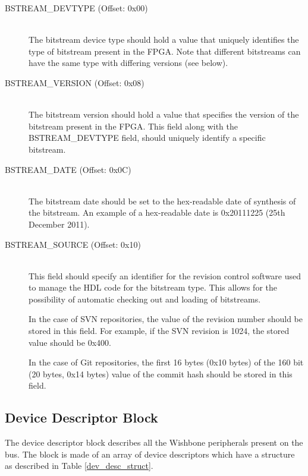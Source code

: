 \documentclass{article}
\begin{document}
\begin{description}
\item[BSTREAM\_DEVTYPE (Offset: 0x00)] \hfill \\
The bitstream device type should hold a value that uniquely identifies the type of 
bitstream present in the FPGA. Note that different bitstreams can have the
same type with differing versions (see below).

\item[BSTREAM\_VERSION (Offset: 0x08)] \hfill \\
The bitstream version should hold a value that specifies the version of the
bitstream present in the FPGA. This field along with the BSTREAM\_DEVTYPE field,
should uniquely identify a specific bitstream.

\item[BSTREAM\_DATE (Offset: 0x0C)] \hfill \\
The bitstream date should be set to the hex-readable date of synthesis of
the bitstream. An example of a hex-readable date is 0x20111225 (25th December
2011).

\item[BSTREAM\_SOURCE (Offset: 0x10)] \hfill \\
This field should specify an identifier for the revision control software
used to manage the HDL code for the bitstream type. This allows for the 
possibility of automatic checking out and loading of bitstreams.

In the case of SVN repositories, the value of the revision number should
be stored in this field. For example, if the SVN revision is 1024, the 
stored value should be 0x400.

In the case of Git repositories, the first 16 bytes (0x10 bytes) of the
160 bit (20 bytes, 0x14 bytes) value of the commit hash should be stored
in this field.

\end{description}

\subsection{Device Descriptor Block}\label{device_block}

The device descriptor block describes all the Wishbone peripherals present
on the bus. The block is made of an array of device descriptors which have
a structure as described in Table \ref{dev_desc_struct}.
\end{document}
